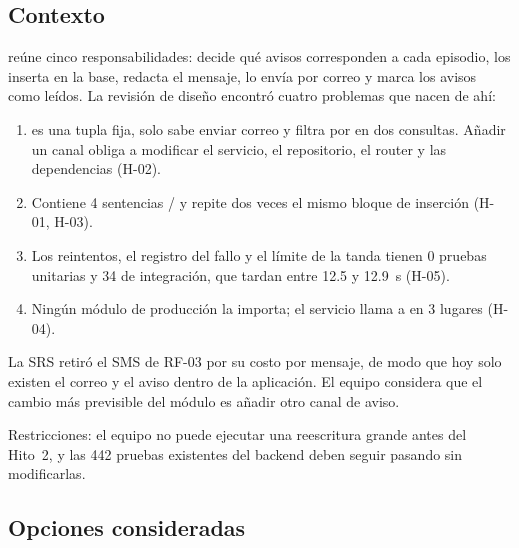 \documentclass[11pt,a4paper]{article}
\begin{document}
\subsection{Contexto}

 reúne cinco responsabilidades: decide qué avisos corresponden a cada episodio, los inserta en la base, redacta el mensaje, lo envía por correo y marca los avisos como leídos. La revisión de diseño encontró cuatro problemas que nacen de ahí:

\begin{enumerate}
  \item {}  es una tupla fija,  solo sabe enviar correo y  filtra por  en dos consultas. Añadir un canal obliga a modificar el servicio, el repositorio, el router y las dependencias (H-02).
  \item {} Contiene 4 sentencias  /  y repite dos veces el mismo bloque de inserción (H-01, H-03).
  \item {} Los reintentos, el registro del fallo y el límite de la tanda tienen 0 pruebas unitarias y 34 de integración, que tardan entre 12.5 y 12.9~s (H-05).
  \item {} Ningún módulo de producción la importa; el servicio llama a  en 3 lugares (H-04).
\end{enumerate}

La SRS retiró el SMS de RF-03 por su costo por mensaje, de modo que hoy solo existen el correo y el aviso dentro de la aplicación. El equipo considera que el cambio más previsible del módulo es añadir otro canal de aviso.

Restricciones: el equipo no puede ejecutar una reescritura grande antes del Hito~2, y las 442 pruebas existentes del backend deben seguir pasando sin modificarlas.

\subsection{Opciones consideradas}
\end{document}
